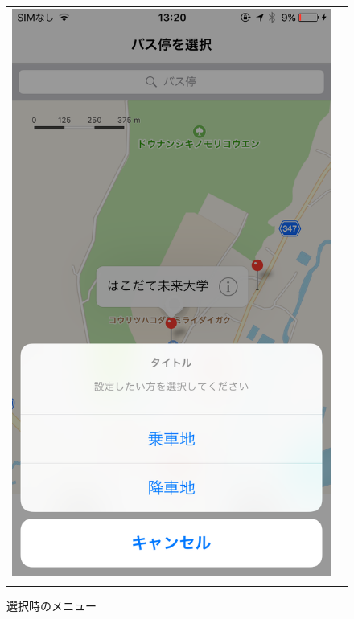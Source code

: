 \documentclass[openany,11pt,papersize]{jsbook}
\begin{document}
\begin{figure}[H]
\begin{tabular}{cc}
      \begin{minipage}[t]{0.45\hsize}
        \centering
        \includegraphics[keepaspectratio, scale=0.2]{img/select_bus.png}
        \caption{選択時のメニュー}
        \label{fig:select_bus}
      \end{minipage}\\
      \begin{minipage}[t]{0.45\hsize}
        \centering

\end{minipage}
\end{tabular}
\end{figure}
\end{document}
